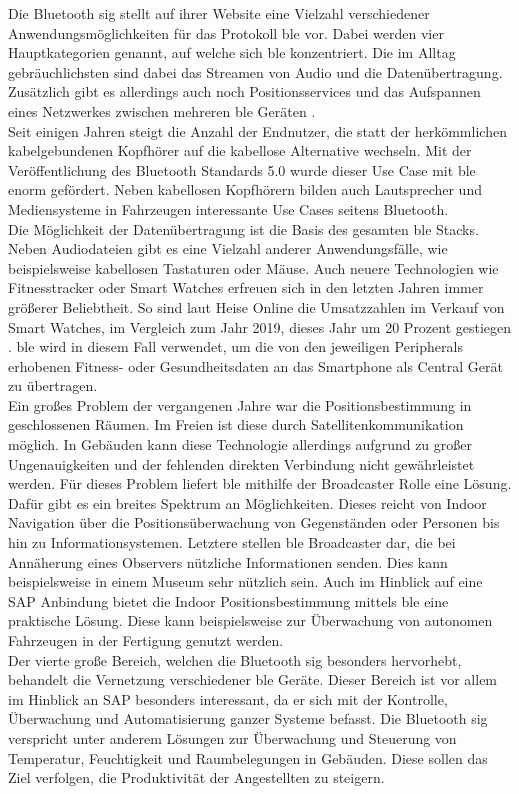 \noindent Die Bluetooth \ac{sig} stellt auf ihrer Website eine Vielzahl verschiedener Anwendungsmöglichkeiten für das Protokoll \ac{ble} vor. Dabei werden vier Hauptkategorien genannt, auf welche sich \ac{ble} konzentriert. Die im Alltag gebräuchlichsten sind dabei das Streamen von Audio und die Datenübertragung. Zusätzlich gibt es allerdings auch noch Positionsservices und das Aufspannen eines Netzwerkes zwischen mehreren \ac{ble} Geräten \cite{BLU20:WWW}.\\
\noindent Seit einigen Jahren steigt die Anzahl der Endnutzer, die statt der herkömmlichen kabelgebundenen Kopfhörer auf die kabellose Alternative wechseln. Mit der Veröffentlichung des Bluetooth Standards 5.0 wurde dieser Use Case mit \ac{ble} enorm gefördert. Neben kabellosen Kopfhörern bilden auch Lautsprecher und Mediensysteme in Fahrzeugen interessante Use Cases seitens Bluetooth.\\
\noindent Die Möglichkeit der Datenübertragung ist die Basis des gesamten \ac{ble} Stacks. Neben Audiodateien gibt es eine Vielzahl anderer Anwendungsfälle, wie beispielsweise kabellosen Tastaturen oder Mäuse. Auch neuere Technologien wie Fitnesstracker oder Smart Watches erfreuen sich in den letzten Jahren immer größerer Beliebtheit. So sind laut Heise Online die Umsatzzahlen im Verkauf von Smart Watches, im Vergleich zum Jahr 2019, dieses Jahr um 20 Prozent gestiegen \cite{HEI20:WWW}. \ac{ble} wird in diesem Fall verwendet, um die von den jeweiligen Peripherals erhobenen Fitness- oder Gesundheitsdaten an das Smartphone als Central Gerät zu übertragen.\\
\noindent Ein großes Problem der vergangenen Jahre war die Positionsbestimmung in geschlossenen Räumen. Im Freien ist diese durch Satellitenkommunikation möglich. In Gebäuden kann diese Technologie allerdings aufgrund zu großer Ungenauigkeiten und der fehlenden direkten Verbindung nicht gewährleistet werden. Für dieses Problem liefert \ac{ble} mithilfe der Broadcaster Rolle eine Lösung. Dafür gibt es ein breites Spektrum an Möglichkeiten. Dieses reicht von Indoor Navigation über die Positionsüberwachung von Gegenständen oder Personen bis hin zu Informationsystemen. Letztere stellen \ac{ble} Broadcaster dar, die bei Annäherung eines Observers nützliche Informationen senden. Dies kann beispielsweise in einem Museum sehr nützlich sein. Auch im Hinblick auf eine SAP Anbindung bietet die Indoor Positionsbestimmung mittels \ac{ble} eine praktische Lösung. Diese kann beispielsweise zur Überwachung von autonomen Fahrzeugen in der Fertigung genutzt werden.\\          
\noindent Der vierte große Bereich, welchen die Bluetooth \ac{sig} besonders hervorhebt, behandelt die Vernetzung verschiedener \ac{ble} Geräte. Dieser Bereich ist vor allem im Hinblick an SAP besonders interessant, da er sich mit der Kontrolle, Überwachung und Automatisierung ganzer Systeme befasst. Die Bluetooth \ac{sig} verspricht unter anderem Lösungen zur Überwachung und Steuerung von Temperatur, Feuchtigkeit und Raumbelegungen in Gebäuden. Diese sollen das Ziel verfolgen, die Produktivität der Angestellten zu steigern.\\   


